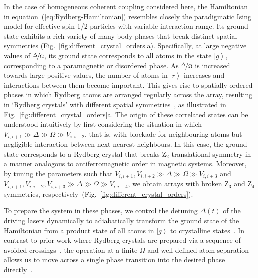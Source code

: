 \documentclass[prl,nobalancelastpage,twocolumn,superscriptaddress,nofootinbib]{revtex4}
\newcommand{\ket}[1]{\left|#1\right\rangle}
\begin{document}
In the case of homogeneous coherent coupling considered here, the Hamiltonian
in equation~(\ref{eq:Rydberg-Hamiltonian}) resembles closely the paradigmatic
Ising model for effective spin-1/2 particles with variable interaction range.
Its ground state exhibits a rich variety of many-body phases that break
distinct spatial symmetries (Fig.~\ref{fig:different_crystal_orders}a).
Specifically, at large negative values of $\nicefrac{\Delta}{\Omega}$, its
ground state corresponds to all atoms in the state $\ket{g}$, corresponding to
a paramagnetic or disordered phase. As $\nicefrac{\Delta}{\Omega}$ is increased
towards large positive values, the number of atoms in $\ket{r}$ increases and
interactions between them become important. This gives rise to spatially
ordered phases in which Rydberg atoms are arranged regularly across the array,
resulting in `Rydberg crystals' with different spatial
symmetries~\cite{Fendley2004,Pohl2010}, as illustrated in
Fig.~\ref{fig:different_crystal_orders}a. The origin of these correlated states
can be understood intuitively by first considering the situation in which
$V_{i,i+1} \gg \Delta \gg \Omega \gg V_{i,i+2}$, that is, with blockade for
neighbouring atoms but negligible interaction between next-nearest neighbours. In
this case, the ground state corresponds to a Rydberg crystal that breaks Z$_2$
translational symmetry in a manner analogous to antiferromagnetic order in
magnetic systems.  Moreover, by tuning the parameters such that $V_{i,i+1},
V_{i,i+2} \gg \Delta \gg \Omega \gg V_{i,i+3}$ and $V_{i,i+1}, V_{i,i+2},
V_{i,i+3} \gg \Delta \gg \Omega \gg V_{i,i+4}$, we obtain arrays with broken
Z$_3$ and Z$_4$ symmetries,
respectively~(Fig.~\ref{fig:different_crystal_orders}).

To prepare the system in these phases, we control the detuning $\Delta(t)$ of
the driving lasers dynamically to adiabatically transform the ground state of
the Hamiltonian from a product state of all atoms in $\ket{g}$ to crystalline
states~\cite{Pohl2010,Schauss2015}. In contrast to prior work where Rydberg
crystals are prepared via a sequence of avoided
crossings~\cite{Pohl2010,Schauss2015,Petrosyan2016}, the operation at a finite
$\Omega$ and well-defined atom separation allows us to move across a
single phase transition into the desired phase directly~\cite{Schachenmayer2010}.
\end{document}
